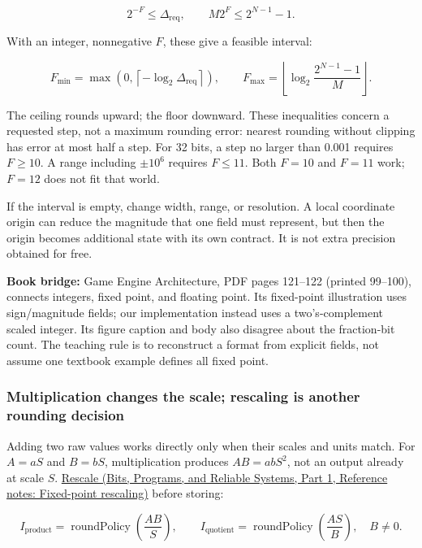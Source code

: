 \[
2^{-F}\le\Delta_{\mathrm{req}},
\qquad
M2^F\le2^{N-1}-1.
\]

With an integer, nonnegative \(F\), these give a feasible interval:

\[
F_{\min}=\max\!\left(0,\left\lceil-\log_2\Delta_{\mathrm{req}}\right\rceil\right),
\qquad
F_{\max}=\left\lfloor\log_2\frac{2^{N-1}-1}{M}\right\rfloor.
\]

The ceiling rounds upward; the floor downward. These inequalities concern a requested step, not a maximum rounding error: nearest rounding without clipping has error at most half a step. For 32 bits, a step no larger than 0.001 requires \(F\ge10\). A range including \(\pm10^6\) requires \(F\le11\). Both \(F=10\) and \(F=11\) work; \(F=12\) does not fit that world.

If the interval is empty, change width, range, or resolution. A local coordinate origin can reduce the magnitude that one field must represent, but then the origin becomes additional state with its own contract. It is not extra precision obtained for free.

\textbf{Book bridge:} Game Engine Architecture, PDF pages 121--122 (printed 99--100), connects integers, fixed point, and floating point. Its fixed-point illustration uses sign/magnitude fields; our implementation instead uses a two's-complement scaled integer. Its figure caption and body also disagree about the fraction-bit count. The teaching rule is to reconstruct a format from explicit fields, not assume one textbook example defines all fixed point.

\subsubsection{Multiplication changes the scale; rescaling is another rounding decision}\label{05-engine-i-ch001-multiplication-changes-the-scale-rescaling-is-another-rounding-decision}

\hypertarget{05-engine-i-ch001-multiplication-changes-the-scale-rescaling-is-another-rounding-decision}{}

Adding two raw values works directly only when their scales and units match. For \(A=aS\) and \(B=bS\), multiplication produces \(AB=abS^2\), not an output already at scale \(S\). \href{../01-Bits-Programs-and-Reliable-Systems-P01/main.pdf\#nameddest=appendix-3333db47830f}{Rescale (Bits, Programs, and Reliable Systems, Part 1, Reference notes: Fixed-point rescaling)} before storing:

\[
I_{\mathrm{product}}=\operatorname{roundPolicy}\!\left(\frac{AB}{S}\right),
\qquad
I_{\mathrm{quotient}}=\operatorname{roundPolicy}\!\left(\frac{AS}{B}\right),\quad B\ne0.
\]

